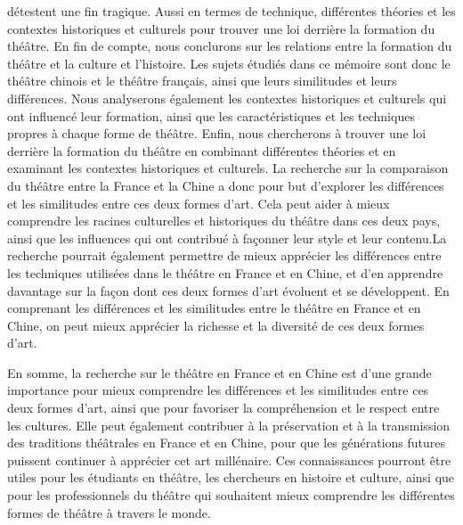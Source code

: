 \documentclass[UTF8,a4paper,12pt]{ctexart}
\numberwithin{equation}{section}
\begin{document}
détestent une fin tragique. Aussi en termes de technique, différentes théories et les contextes historiques et culturels pour trouver une loi derrière la formation du théâtre. En fin de compte, nous conclurons sur les relations entre la formation du théâtre et la culture et l'histoire. Les sujets étudiés dans ce mémoire sont donc le théâtre chinois et le théâtre français, ainsi que leurs similitudes et leurs différences. Nous analyserons également les contextes historiques et culturels qui ont influencé leur formation, ainsi que les caractéristiques et les techniques propres à chaque forme de théâtre. Enfin, nous chercherons à trouver une loi derrière la formation du théâtre en combinant différentes théories et en examinant les contextes historiques et culturels. La recherche sur la comparaison du théâtre entre la France et la Chine a donc pour but d'explorer les différences et les similitudes entre ces deux formes d'art. Cela peut aider à mieux comprendre les racines culturelles et historiques du théâtre dans ces deux pays, ainsi que les influences qui ont contribué à façonner leur style et leur contenu.La recherche pourrait également permettre de mieux apprécier les différences entre les techniques utilisées dans le théâtre en France et en Chine, et d'en apprendre davantage sur la façon dont ces deux formes d'art évoluent et se développent. En comprenant les différences et les similitudes entre le théâtre en France et en Chine, on peut mieux apprécier la richesse et la diversité de ces deux formes d'art.

En somme, la recherche sur le théâtre en France et en Chine est d'une grande importance pour mieux comprendre les différences et les similitudes entre ces deux formes d'art, ainsi que pour favoriser la compréhension et le respect entre les cultures. Elle peut également contribuer à la préservation et à la transmission des traditions théâtrales en France et en Chine, pour que les générations futures puissent continuer à apprécier cet art millénaire. Ces connaissances pourront être utiles pour les étudiants en théâtre, les chercheurs en histoire et culture, ainsi que pour les professionnels du théâtre qui souhaitent mieux comprendre les différentes formes de théâtre à travers le monde.


\newpage
{}
 \label{sec:1}
\end{document}
